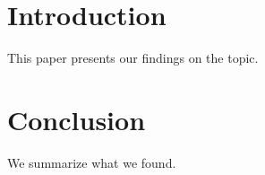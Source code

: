 \documentclass{article}
\begin{document}
\tableofcontents

\section{Introduction}

This paper presents our findings on the topic.

\section{Conclusion}

We summarize what we found.
\end{document}
